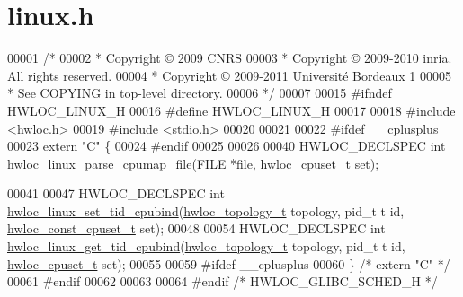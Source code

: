 \hypertarget{a00035_source}{
\section{linux.h}
}

\begin{DoxyCode}
00001 \textcolor{comment}{/*}
00002 \textcolor{comment}{ * Copyright © 2009 CNRS}
00003 \textcolor{comment}{ * Copyright © 2009-2010 inria.  All rights reserved.}
00004 \textcolor{comment}{ * Copyright © 2009-2011 Université Bordeaux 1}
00005 \textcolor{comment}{ * See COPYING in top-level directory.}
00006 \textcolor{comment}{ */}
00007 
00015 \textcolor{preprocessor}{#ifndef HWLOC\_LINUX\_H}
00016 \textcolor{preprocessor}{}\textcolor{preprocessor}{#define HWLOC\_LINUX\_H}
00017 \textcolor{preprocessor}{}
00018 \textcolor{preprocessor}{#include <hwloc.h>}
00019 \textcolor{preprocessor}{#include <stdio.h>}
00020 
00021 
00022 \textcolor{preprocessor}{#ifdef \_\_cplusplus}
00023 \textcolor{preprocessor}{}\textcolor{keyword}{extern} \textcolor{stringliteral}{"C"} \{
00024 \textcolor{preprocessor}{#endif}
00025 \textcolor{preprocessor}{}
00026 
00040 HWLOC\_DECLSPEC \textcolor{keywordtype}{int} \hyperlink{a00067_gaeacad897c30dbea284948374ad4b010c}{hwloc_linux_parse_cpumap_file}(FILE *file, \hyperlink{a00040_ga4bbf39b68b6f568fb92739e7c0ea7801}{hwloc_cpuset_t} \textcolor{keyword}{set});
      
00041 
00047 HWLOC\_DECLSPEC \textcolor{keywordtype}{int} \hyperlink{a00067_gaaaca5d1687053b6c3326b2c165bd6530}{hwloc_linux_set_tid_cpubind}(\hyperlink{a00039_ga9d1e76ee15a7dee158b786c30b6a6e38}{hwloc_topology_t} topology, pid\_t t
      id, \hyperlink{a00040_ga1f784433e9b606261f62d1134f6a3b25}{hwloc_const_cpuset_t} \textcolor{keyword}{set});
00048 
00054 HWLOC\_DECLSPEC \textcolor{keywordtype}{int} \hyperlink{a00067_gaf36a9211a21eb930f59090eb5d460b8e}{hwloc_linux_get_tid_cpubind}(\hyperlink{a00039_ga9d1e76ee15a7dee158b786c30b6a6e38}{hwloc_topology_t} topology, pid\_t t
      id, \hyperlink{a00040_ga4bbf39b68b6f568fb92739e7c0ea7801}{hwloc_cpuset_t} \textcolor{keyword}{set});
00055 
00059 \textcolor{preprocessor}{#ifdef \_\_cplusplus}
00060 \textcolor{preprocessor}{}\} \textcolor{comment}{/* extern "C" */}
00061 \textcolor{preprocessor}{#endif}
00062 \textcolor{preprocessor}{}
00063 
00064 \textcolor{preprocessor}{#endif }\textcolor{comment}{/* HWLOC\_GLIBC\_SCHED\_H */}
\end{DoxyCode}
